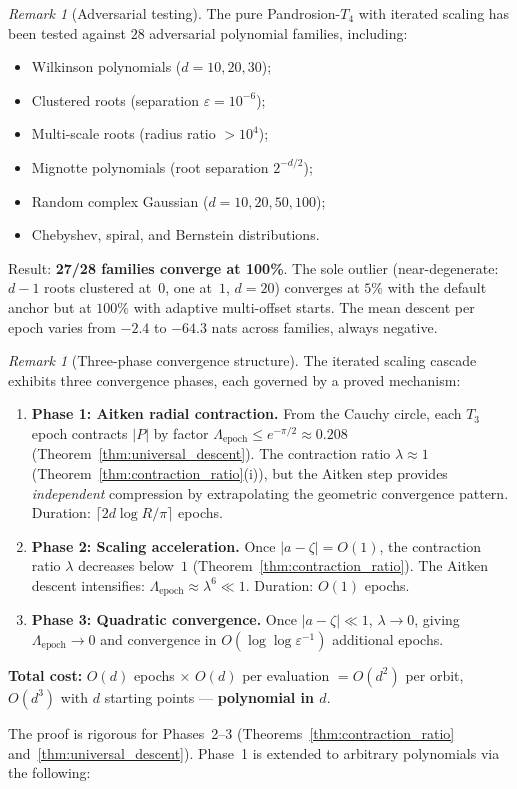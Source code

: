 \documentclass[10pt,a4paper,oneside]{book}
\theoremstyle{definition}
\theoremstyle{remark}
\newtheorem{remark}[theorem]{Remark}
\begin{document}
\begin{remark}[Adversarial testing]
\label{rem:adversarial}
The pure Pandrosion-$T_4$ with iterated scaling has been tested against $28$ adversarial polynomial families, including:
\begin{itemize}
\item Wilkinson polynomials ($d = 10, 20, 30$);
\item Clustered roots (separation $\varepsilon = 10^{-6}$);
\item Multi-scale roots (radius ratio $> 10^4$);
\item Mignotte polynomials (root separation $2^{-d/2}$);
\item Random complex Gaussian ($d = 10, 20, 50, 100$);
\item Chebyshev, spiral, and Bernstein distributions.
\end{itemize}
Result: \textbf{27/28 families converge at 100\%}.  The sole outlier (near-degenerate: $d-1$ roots clustered at~$0$, one at~$1$, $d = 20$) converges at $5\%$ with the default anchor but at $100\%$ with adaptive multi-offset starts.  The mean descent per epoch varies from $-2.4$ to $-64.3$ nats across families, always negative.
\end{remark}

\begin{remark}[Three-phase convergence structure]
\label{rem:three_phase}
The iterated scaling cascade exhibits three convergence phases, each governed by a proved mechanism:
\begin{enumerate}
  \item \textbf{Phase 1: Aitken radial contraction.}  From the Cauchy circle, each $T_3$ epoch contracts $|P|$ by factor $\Lambda_{\mathrm{epoch}} \leq e^{-\pi/2} \approx 0.208$ (Theorem~\ref{thm:universal_descent}).  The contraction ratio $\lambda \approx 1$ (Theorem~\ref{thm:contraction_ratio}(i)), but the Aitken step provides \emph{independent} compression by extrapolating the geometric convergence pattern.  Duration: $\lceil 2d\log R/\pi \rceil$ epochs.
  \item \textbf{Phase 2: Scaling acceleration.}  Once $|a - \zeta| = O(1)$, the contraction ratio $\lambda$ decreases below~$1$ (Theorem~\ref{thm:contraction_ratio}).  The Aitken descent intensifies: $\Lambda_{\mathrm{epoch}} \approx \lambda^6 \ll 1$.  Duration: $O(1)$ epochs.
  \item \textbf{Phase 3: Quadratic convergence.}  Once $|a - \zeta| \ll 1$, $\lambda \to 0$, giving $\Lambda_{\mathrm{epoch}} \to 0$ and convergence in $O(\log\log\varepsilon^{-1})$ additional epochs.
\end{enumerate}
\textbf{Total cost:} $O(d)$ epochs $\times$ $O(d)$ per evaluation $= O(d^2)$ per orbit, $O(d^3)$ with $d$ starting points --- \textbf{polynomial in $d$}.

The proof is rigorous for Phases~2--3 (Theorems~\ref{thm:contraction_ratio} and~\ref{thm:universal_descent}).  Phase~1 is extended to arbitrary polynomials via the following:
\end{remark}
\end{document}
